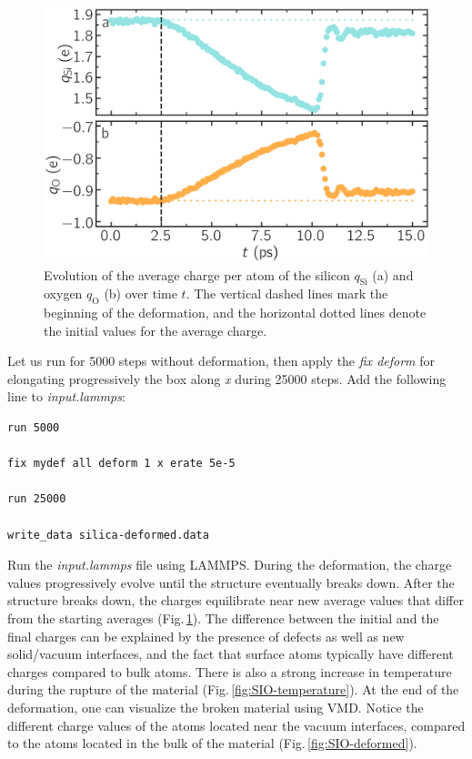 \documentclass[9pt,tutorial]{livecoms}
\begin{document}
\begin{figure}
\includegraphics[width=\linewidth]{SIO-deformed-charge}
\caption{Evolution of the average charge per atom of the silicon $q_\text{Si}$ (a) and oxygen $q_\text{O}$ (b) over time $t$. The vertical dashed lines mark the beginning of the deformation, and the horizontal dotted lines denote the initial values for the average charge.}
\label{fig:SIO-deformed-charge}
\end{figure}

Let us run for 5000 steps without deformation, then apply the \textit{fix deform} for elongating progressively the box along \textit{x} during 25000 steps. Add the following line to \textit{input.lammps}:
{\normalsize \begin{verbatim}
run 5000

fix mydef all deform 1 x erate 5e-5

run 25000

write_data silica-deformed.data
\end{verbatim}}
Run the \textit{input.lammps} file using LAMMPS. During the deformation, the charge values progressively evolve until the structure eventually breaks down. After the structure breaks down, the charges equilibrate near new average values that differ from the starting averages (Fig.\,\ref{fig:SIO-deformed-charge}). The difference between the initial and the final charges can be explained by the presence of defects as well as new solid/vacuum interfaces, and the fact that surface atoms typically have different charges compared to bulk atoms. There is also a strong increase in temperature during the rupture of the material (Fig.\,\ref{fig:SIO-temperature}). At the end of the deformation, one can visualize the broken material using VMD. Notice the different charge values of the atoms located near the vacuum interfaces, compared to the atoms located in the bulk of the material (Fig.\,\ref{fig:SIO-deformed}).
\end{document}
